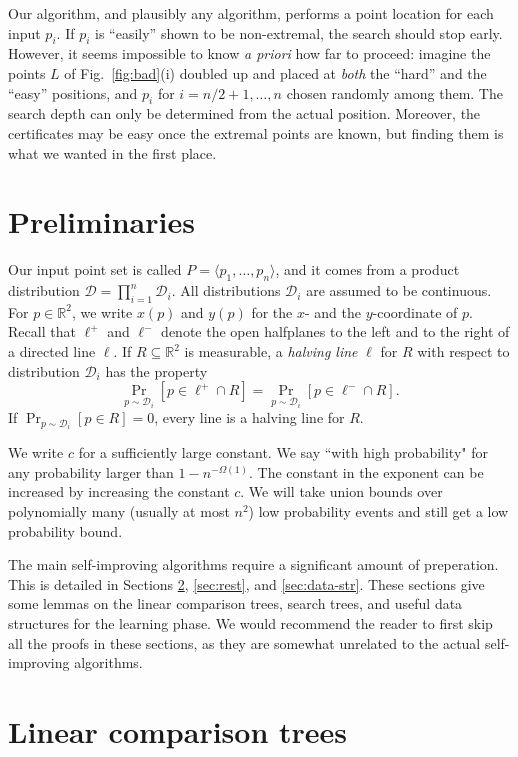 \documentclass[letterpaper,11pt]{article}
\newcommand{\R}{\mathbb{R}}
\newcommand{\cD}{\mathcal{D}}
\begin{document}
Our algorithm, and plausibly 
any algorithm, performs a 
point location for each input $p_i$.
If $p_i$ is ``easily'' shown to be 
non-extremal, the search 
should stop early. 
However, it seems
impossible to know \emph{a priori}
how far to proceed: imagine 
the points $L$ of Fig.~\ref{fig:bad}(i) 
doubled up and placed at \emph{both} 
the ``hard'' and the ``easy'' positions, 
and $p_i$ for $i=n/2+1, \dots, n$ chosen 
randomly among them. The 
search depth can only be 
determined from the actual 
position. Moreover, the certificates may 
be easy once the extremal points are known,
but finding them is what we wanted in the
first place.

\section{Preliminaries}
\label{sec:prelims}

 Our input point set 
is called 
$P = \langle p_1, \dots, p_n\rangle$, 
and it comes from a product
distribution 
$\cD = \prod_{i=1}^n \cD_i$. 
All distributions $\cD_i$
are assumed to be continuous.
For $p \in \R^2$, we 
write $x(p)$ and $y(p)$ for the 
$x$- and the $y$-coordinate 
of $p$.  Recall that 
$\ell^+$ and $\ell^-$ denote
the open halfplanes to
the left and to the right of
a directed line $\ell$.
If $R \subseteq \R^2$ is measurable, 
a \emph{halving line} $\ell$
for $R$ with respect to distribution
$\cD_i$ has the property 
\[
  \Pr_{p \sim \cD_i}[p \in \ell^+ \cap R] = 
  \Pr_{p \sim \cD_i}[p \in \ell^- \cap R].
\]
If $\Pr_{p \sim \cD_i}[p \in R] = 0$, every 
line is a halving line for $R$. 

We write $c$ for a sufficiently 
large constant.
We say ``with high probability" for 
any probability larger than 
$1 - n^{-\Omega(1)}$.
The constant in the exponent 
can be increased by increasing
the constant $c$. We will take union 
bounds over polynomially many 
(usually at most $n^2$) 
low probability events and still get a 
low probability bound.

The main self-improving algorithms require a significant amount of preperation. This is detailed in Sections \ref{sec:comp}, \ref{sec:rest}, and \ref{sec:data-str}. These sections give some lemmas
on the linear comparison trees, search trees, and useful data structures for the learning phase.
We would recommend the reader to first
skip all the proofs in these sections, as they are somewhat unrelated to the actual self-improving algorithms.

\section{Linear comparison trees} \label{sec:comp}
\end{document}
